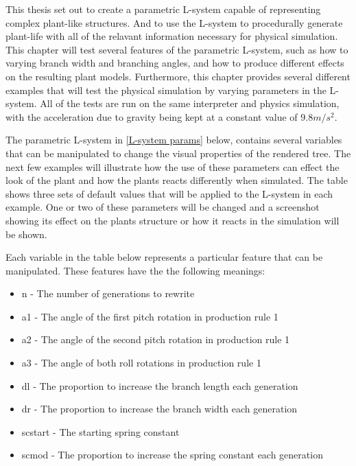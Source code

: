 This thesis set out to create a parametric L-system capable of representing complex plant-like structures. And to use the L-system to procedurally generate plant-life with all of the relavant information necessary for physical simulation. This chapter will test several features of the parametric L-system, such as how to varying branch width and branching angles, and how to produce different effects on the resulting plant models. Furthermore, this chapter provides several different examples that will test the physical simulation by varying parameters in the L-system. All of the tests are run on the same interpreter and physics simulation, with the acceleration due to gravity being kept at a constant value of $9.8m/s^2$. 

The parametric L-system in \ref{L-system params} below, contains several variables that can be manipulated to change the visual properties of the rendered tree. The next few examples will illustrate how the use of these parameters can effect the look of the plant and how the plants reacts differently when simulated. The table shows three sets of default values that will be applied to the L-system in each example. One or two of these parameters will be changed and a screenshot showing its effect on the plants structure or how it reacts in the simulation will be shown.

Each variable in the table below represents a particular feature that can be manipulated. These features have the the following meanings: 


\begin{itemize}[noitemsep]
	\item n - The number of generations to rewrite
	\item a1 - The angle of the first pitch rotation in production rule 1
	\item a2 - The angle of the second pitch rotation in production rule 1
	\item a3 - The angle of both roll rotations in production rule 1
	\item dl - The proportion to increase the branch length each generation
	\item dr - The proportion to increase the branch width each generation
	\item scstart - The starting spring constant 
	\item scmod - The proportion to increase the spring constant each generation
\end{itemize}


